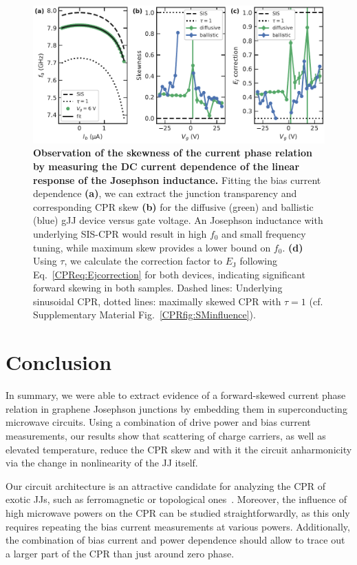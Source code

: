 \begin{figure}[t]
	\centering
	\includegraphics[width=\linewidth]{chapter-gJJ-CPR/figs/Figure4}
	\caption{
		\textbf{Observation of the skewness of the current phase relation by measuring the DC current dependence of the linear response of the Josephson inductance.}
		Fitting the bias current dependence \textbf{(a)}, we can extract the junction transparency and corresponding CPR skew \textbf{(b)} for the diffusive (green) and ballistic (blue) gJJ device versus gate voltage.
		An Josephson inductance with underlying SIS-CPR would result in high $f_0$ and small frequency tuning, while maximum skew provides a lower bound on $f_0$.
		\textbf{(d)} Using $\tau$, we calculate the correction factor to $E_\text{J}$ following Eq.~\ref{CPReq:Ejcorrection} for both devices, indicating significant forward skewing in both samples.
		Dashed lines: Underlying sinusoidal CPR, dotted lines: maximally skewed CPR with $\tau=1$ (cf. Supplementary Material Fig.~\ref{CPRfig:SMinfluence}).
	}
	\label{CPRfig:figure4}
\end{figure}

\section{Conclusion}

In summary, we were able to extract evidence of a forward-skewed current phase relation in graphene Josephson junctions by embedding them in superconducting microwave circuits.
%
Using a combination of drive power and bias current measurements, our results show that scattering of charge carriers, as well as elevated temperature, reduce the CPR skew and with it the circuit anharmonicity via the change in nonlinearity of the JJ itself.

Our circuit architecture is an attractive candidate for analyzing the CPR of exotic JJs, such as ferromagnetic or topological ones~\cite{golubovCurrentphaseRelationJosephson2004a,sochnikovNonsinusoidalCurrentPhaseRelationship2015,stoutimoreSecondHarmonicCurrentPhaseRelation2018,assoulineSpinOrbitInducedPhaseshift2019,muraniMicrowaveSignatureTopological2019}.
%
Moreover, the influence of high microwave powers on the CPR can be studied straightforwardly, as this only requires repeating the bias current measurements at various powers.
%
Additionally, the combination of bias current and power dependence should allow to trace out a larger part of the CPR than just around zero phase.

